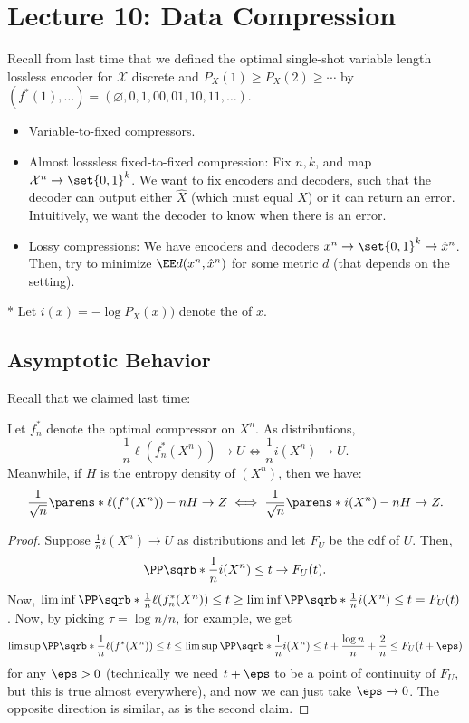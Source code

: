 \section*{Lecture 10: Data Compression}
\setcounter{section}{10}

Recall from last time that we defined the optimal single-shot variable length lossless encoder for $\mathcal X$ discrete and $P_X(1) \geq P_X(2) \geq \cdots$ by $(f^*(1), \ldots) = (\varnothing, 0, 1, 00, 01, 10, 11, \ldots)$.

\begin{defn}
	\begin{itemize}
		\item Variable-to-fixed compressors.
		\item Almost losssless fixed-to-fixed compression: Fix $n,k$, and map $\mathcal X^n \to \set{0,1}^k$. We want to fix encoders and decoders, such that the decoder can output either $\hat X$ (which must equal $X$) or it can return an error. Intuitively, we want the decoder to know when there is an error.
		\item Lossy compressions: We have encoders and decoders $x^n \to \set{0,1}^k \to \hat x^n$. Then, try to minimize $\EE d(x^n, \hat x^n)$ for some metric $d$ (that depends on the setting).
	\end{itemize}
\end{defn}	

\begin{defn}*
	Let $i(x) = -\log P_X(x))$ denote the  of $x$.
\end{defn}

\subsection{Asymptotic Behavior}

Recall that we claimed last time:

\begin{fact}
	Let $f_n^*$ denote the optimal compressor on $X^n$.
	As distributions, \[
		\frac 1n \ell(f_n^*(X^n))\to U \iff \frac 1n i(X^n) \to U.
	\]
	Meanwhile, if $H$ is the entropy density of $(X^n)$, then we have: \[
		\frac 1{\sqrt n} \parens*{\ell(f^*(X^n)) -nH} \to Z \iff \frac 1{\sqrt n} \parens*{i(X^n) - nH}\to Z.
	\]
\end{fact}

\begin{proof}
	Suppose $\frac 1n i(X^n)\to U$ as distributions and let $F_U$ be the cdf of $U$. Then, \[
		\PP\sqrb*{\frac 1n i(X^n)\leq t} \to F_U(t).
	\]
	Now, $\liminf \PP\sqrb*{\frac 1n \ell(f_n^*(X^n)) \leq t} \geq \liminf \PP\sqrb*{\frac 1n i(X^n)\leq t} = F_U(t)$.
	Now, by picking $\tau = \log n/n$, for example, we get \[
		\limsup \PP\sqrb*{\frac 1n \ell(f^*(X^n))\leq t} \leq \limsup \PP\sqrb*{\frac 1n i(X^n) \leq t + \frac{\log n}n} + \frac 2n \leq F_U(t+\eps)
	\]
	for any $\eps > 0$ (technically we need $t+\eps$ to be a point of continuity of $F_U$, but this is true almost everywhere), and now we can just take $\eps\to 0$.
	The opposite direction is similar, as is the second claim.
\end{proof}

